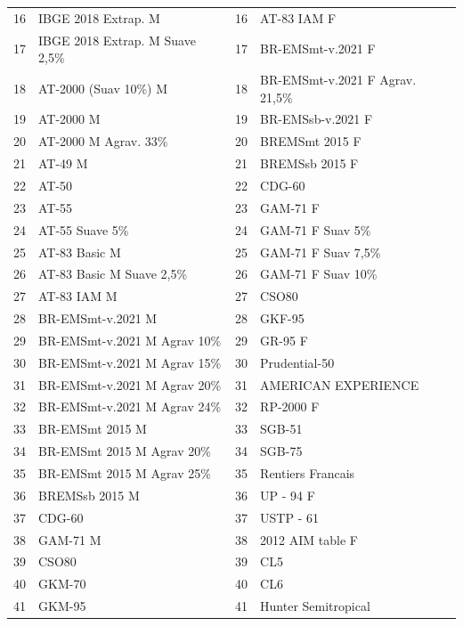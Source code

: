 \begin{singlespace}
\begin{longtable}{clcl}
16 & IBGE 2018 Extrap. M               & 16 & AT-83 IAM F \\
17 & IBGE 2018 Extrap. M Suave 2,5\%  & 17 & BR-EMSmt-v.2021 F \\
18 & AT-2000 (Suav 10\%) M            & 18 & BR-EMSmt-v.2021 F Agrav. 21,5\% \\
19 & AT-2000 M                         & 19 & BR-EMSsb-v.2021 F \\
20 & AT-2000 M Agrav. 33\%            & 20 & BREMSmt 2015 F \\
21 & AT-49 M                           & 21 & BREMSsb 2015 F \\
22 & AT-50                             & 22 & CDG-60 \\
23 & AT-55                             & 23 & GAM-71 F \\
24 & AT-55 Suave 5\%                  & 24 & GAM-71 F Suav 5\% \\
25 & AT-83 Basic M                     & 25 & GAM-71 F Suav 7,5\% \\
26 & AT-83 Basic M Suave 2,5\%        & 26 & GAM-71 F Suav 10\% \\
27 & AT-83 IAM M                       & 27 & CSO80 \\
28 & BR-EMSmt-v.2021 M                & 28 & GKF-95 \\
29 & BR-EMSmt-v.2021 M Agrav 10\%    & 29 & GR-95 F \\
30 & BR-EMSmt-v.2021 M Agrav 15\%    & 30 & Prudential-50 \\
31 & BR-EMSmt-v.2021 M Agrav 20\%    & 31 & AMERICAN EXPERIENCE \\
32 & BR-EMSmt-v.2021 M Agrav 24\%    & 32 & RP-2000 F \\
33 & BR-EMSmt 2015 M                  & 33 & SGB-51 \\
34 & BR-EMSmt 2015 M Agrav 20\%      & 34 & SGB-75 \\
35 & BR-EMSmt 2015 M Agrav 25\%      & 35 & Rentiers Francais \\
36 & BREMSsb 2015 M                   & 36 & UP - 94 F \\
37 & CDG-60                            & 37 & USTP - 61 \\
38 & GAM-71 M                          & 38 & 2012 AIM table F \\
39 & CSO80                             & 39 & CL5 \\
40 & GKM-70                            & 40 & CL6 \\
41 & GKM-95                            & 41 & Hunter Semitropical \\

\end{longtable}
\end{singlespace}
